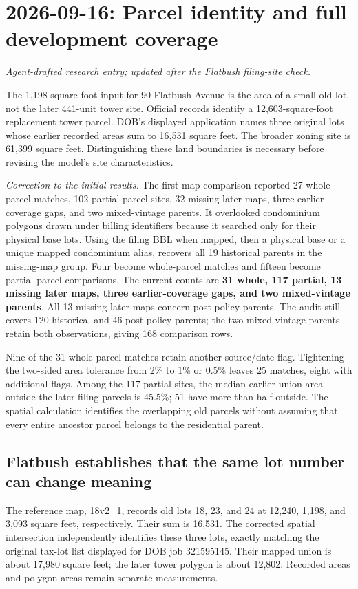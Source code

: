 \clearpage
\section*{2026-09-16: Parcel identity and full development coverage}
\textit{Agent-drafted research entry; updated after the Flatbush filing-site check.}

The 1,198-square-foot input for 90 Flatbush Avenue is the area of a small old
lot, not the later 441-unit tower site. Official records identify a
12,603-square-foot replacement tower parcel. DOB's displayed application names
three original lots whose earlier recorded areas sum to 16,531 square feet.
The broader zoning site is 61,399 square feet. Distinguishing these land
boundaries is necessary before revising the model's site characteristics.

\textit{Correction to the initial results.} The first map comparison reported
27 whole-parcel matches, 102 partial-parcel sites, 32 missing later maps,
three earlier-coverage gaps, and two mixed-vintage parents. It overlooked
condominium polygons drawn under billing identifiers because it searched only
for their physical base lots. Using the filing BBL when mapped, then a
physical base or a unique mapped condominium alias, recovers all 19 historical
parents in the missing-map group. Four become whole-parcel matches and fifteen
become partial-parcel comparisons. The current counts are \textbf{31 whole,
117 partial, 13 missing later maps, three earlier-coverage gaps, and two
mixed-vintage parents}. All 13 missing later maps concern post-policy parents.
The audit still covers 120 historical and 46 post-policy parents; the two
mixed-vintage parents retain both observations, giving 168 comparison rows.

Nine of the 31 whole-parcel matches retain another source/date flag. Tightening
the two-sided area tolerance from 2\% to 1\% or 0.5\% leaves 25 matches, eight
with additional flags. Among the 117 partial sites, the median earlier-union
area outside the later filing parcels is 45.5\%; 51 have more than half outside.
The spatial calculation identifies the overlapping old parcels without
assuming that every entire ancestor parcel belongs to the residential parent.

\subsection*{Flatbush establishes that the same lot number can change meaning}

The reference map, 18v2\_1, records old lots 18, 23, and 24 at 12,240, 1,198,
and 3,093 square feet, respectively. Their sum is 16,531. The corrected spatial
intersection independently identifies these three lots, exactly matching the
original tax-lot list displayed for DOB job 321595145. Their mapped union is
about 17,980 square feet; the later tower polygon is about 12,802. Recorded
areas and polygon areas remain separate measurements.

